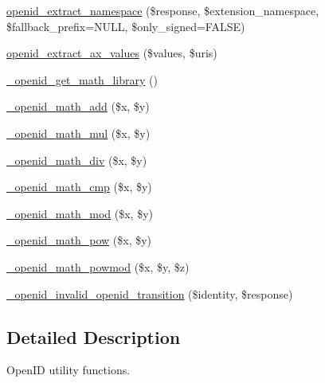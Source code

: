 \begin{DoxyCompactItemize}
\item 
\hyperlink{openid_8inc_ace5c6d4c1e729d620d6a43273fac7fd6}{openid\_\-extract\_\-namespace} (\$response, \$extension\_\-namespace, \$fallback\_\-prefix=NULL, \$only\_\-signed=FALSE)
\item 
\hyperlink{openid_8inc_adf7dfa87340980c5bf7e4cd11e717da3}{openid\_\-extract\_\-ax\_\-values} (\$values, \$uris)
\item 
\hyperlink{openid_8inc_a00d68cf0fdb81c4031ecf0fa7f0c2845}{\_\-openid\_\-get\_\-math\_\-library} ()
\item 
\hyperlink{openid_8inc_aeaea462656fcdd8460240178b6cd76a1}{\_\-openid\_\-math\_\-add} (\$x, \$y)
\item 
\hyperlink{openid_8inc_a4081e0bfb8cf14326b426c89e4293952}{\_\-openid\_\-math\_\-mul} (\$x, \$y)
\item 
\hyperlink{openid_8inc_a744c3bb5bec3bb9be16c1445b32f9399}{\_\-openid\_\-math\_\-div} (\$x, \$y)
\item 
\hyperlink{openid_8inc_ae52dd06bfa5de08a302bad1b9795b3f6}{\_\-openid\_\-math\_\-cmp} (\$x, \$y)
\item 
\hyperlink{openid_8inc_ac33215e0ff27a3d2e454891ead7662a9}{\_\-openid\_\-math\_\-mod} (\$x, \$y)
\item 
\hyperlink{openid_8inc_ad4c65d1b75dba1aca1ad0ea32bcd4d1c}{\_\-openid\_\-math\_\-pow} (\$x, \$y)
\item 
\hyperlink{openid_8inc_a45d8a622c010b733b6e3b5365b02c2f4}{\_\-openid\_\-math\_\-powmod} (\$x, \$y, \$z)
\item 
\hyperlink{openid_8inc_a239b587eb43a464005a538f698873a61}{\_\-openid\_\-invalid\_\-openid\_\-transition} (\$identity, \$response)
\end{DoxyCompactItemize}


\subsection{Detailed Description}
OpenID utility functions. 

